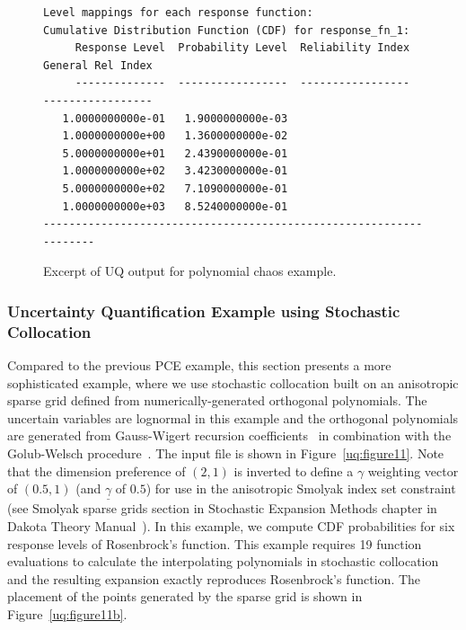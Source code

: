 \begin{figure}[htbp!]
\begin{bigbox}
\begin{scriptsize}
\begin{verbatim}
Level mappings for each response function:
Cumulative Distribution Function (CDF) for response_fn_1:
     Response Level  Probability Level  Reliability Index  General Rel Index
     --------------  -----------------  -----------------  -----------------
   1.0000000000e-01   1.9000000000e-03
   1.0000000000e+00   1.3600000000e-02
   5.0000000000e+01   2.4390000000e-01
   1.0000000000e+02   3.4230000000e-01
   5.0000000000e+02   7.1090000000e-01
   1.0000000000e+03   8.5240000000e-01
-------------------------------------------------------------------
\end{verbatim}
\end{scriptsize}
\end{bigbox}
\caption{Excerpt of UQ output for polynomial chaos example.}
\label{uq:examples:pce_out}
\end{figure}

\subsubsection{Uncertainty Quantification Example using Stochastic Collocation}
\label{uq:stoch_exp:ex:sc}


Compared to the previous PCE example, this section presents a more
sophisticated example, where we use stochastic collocation built on an
anisotropic sparse grid defined from numerically-generated orthogonal
polynomials. The uncertain variables are lognormal in this example and
the orthogonal polynomials are generated from Gauss-Wigert recursion
coefficients~\cite{simpson_gw} in combination with the Golub-Welsch
procedure~\cite{GolubWelsch69}.  The input file is shown in
Figure~\ref{uq:figure11}.  Note that the dimension preference of
$(2,1)$ is inverted to define a $\gamma$ weighting vector of $(0.5,1)$
(and $\underline{\gamma}$ of $0.5$) for use in the anisotropic Smolyak
index set constraint (see Smolyak sparse grids section in Stochastic
Expansion Methods chapter in Dakota Theory Manual~\cite{TheoMan}). In
this example, we compute CDF probabilities for six response levels of
Rosenbrock's function. This example requires 19 function evaluations
to calculate the interpolating polynomials in stochastic collocation
and the resulting expansion exactly reproduces Rosenbrock's function.
The placement of the points generated by the sparse grid is shown in
Figure~\ref{uq:figure11b}.

